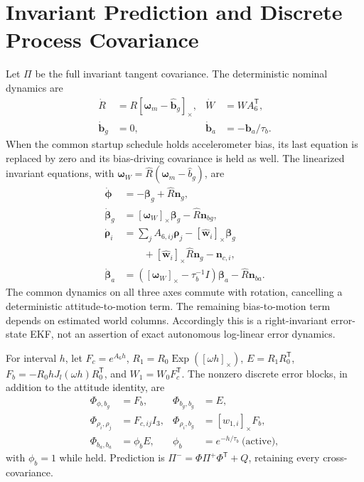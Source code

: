 \documentclass[conference]{IEEEtran}
\newcommand{\vc}[1]{\bm{#1}}
\newcommand{\tr}{^{\mathsf T}}
\newcommand{\sk}[1]{[#1]_\times}
\begin{document}
\section{Invariant Prediction and Discrete Process Covariance}
\label{sec:kalman}
Let $\Pi$ be the full invariant tangent covariance. The deterministic
nominal dynamics are
\begin{align}
 \dot R&=R\sk{\vc\omega_m-\hat{\vc b}_g},&\dot W&=WA_6\tr,\\
 \dot{\vc b}_g&=0,&\dot{\vc b}_a&=-\vc b_a/\tau_b.
\end{align}
When the common startup schedule holds accelerometer bias, its last equation
is replaced by zero and its bias-driving covariance is held as well. The
linearized invariant equations, with $\vc\omega_W=\hat R(\vc\omega_m-\hat b_g)$,
are
\begin{align}
 \dot{\vc\phi}&=-\vc\beta_g+\hat R\vc n_g,\\
 \dot{\vc\beta}_g&=\sk{\vc\omega_W}\vc\beta_g-\hat R\vc n_{bg},\\
 \dot{\vc\rho}_i&=\sum_j A_{6,ij}\vc\rho_j-\sk{\hat{\vc w}_i}\vc\beta_g\nonumber\\
 &\qquad+\sk{\hat{\vc w}_i}\hat R\vc n_g-\vc n_{c,i},\\
 \dot{\vc\beta}_a&=(\sk{\vc\omega_W}-\tau_b^{-1}I)\vc\beta_a-\hat R\vc n_{ba}.
 \label{eq:invariantcontinuous}
\end{align}
The common dynamics on all three axes commute with rotation, cancelling a
deterministic attitude-to-motion term. The remaining bias-to-motion term
depends on estimated world columns. Accordingly this is a right-invariant
error-state EKF, not an assertion of exact autonomous log-linear error dynamics.

For interval $h$, let $F_c=e^{A_6h}$, $R_1=R_0\operatorname{Exp}([\omega h]_\times)$,
$E=R_1R_0\tr$, $F_b=-R_0hJ_l(\omega h)R_0\tr$, and $W_1=W_0F_c\tr$.
The nonzero discrete error blocks, in addition to the attitude identity, are
\begin{align}
 \Phi_{\phi,b_g}&=F_b,&\Phi_{b_g,b_g}&=E,\\
 \Phi_{\rho_i,\rho_j}&=F_{c,ij}I_3,&
 \Phi_{\rho_i,b_g}&=\sk{w_{1,i}}F_b,\\
 \Phi_{b_a,b_a}&=\phi_b E,&\phi_b&=e^{-h/\tau_b}\ \text{(active)},
\end{align}
with $\phi_b=1$ while held. Prediction is $\Pi^-=\Phi\Pi^+\Phi\tr+Q$,
retaining every cross-covariance.
\end{document}
